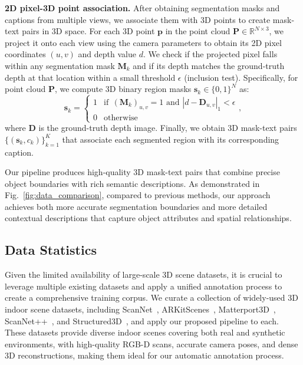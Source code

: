 \noindent\textbf{2D pixel-3D point association.}
After obtaining segmentation masks and captions from multiple views, we associate them with 3D points to create mask-text pairs in 3D space.
For each 3D point $\mathbf{p}$ in the point cloud $\mathbf{P} \in \mathbb{R}^{N\times3}$, we project it onto each view using the camera parameters to obtain its 2D pixel coordinates $(u,v)$ and depth value $d$.
We check if the projected pixel falls within any segmentation mask $\mathbf{M}_k$ and if its depth matches the ground-truth depth at that location within a small threshold $\epsilon$ (inclusion test).
Specifically, for point cloud $\mathbf{P}$, 
we compute 3D binary region masks $\mathbf{s}_k \in \{0,1\}^N$ as:
\begin{equation}\label{eq:associate}
    \!\! \mathbf{s}_k = \left\{ 
    \begin{array}{cl}
        \! 1 & \!\!\! \textrm{if}~~(\mathbf{M}_{k})_{u,v} = 1 \textrm{ and } |d - \mathbf{D}_{u,v}|_1 < \epsilon \\
        \! 0 & \!\!\! \textrm{otherwise}
    \end{array}
    \right. \!\!\!\! ,
\end{equation}
where $\mathbf{D}$ is the ground-truth depth image. Finally, we obtain 3D mask-text pairs $\{(\mathbf{s}_k, c_k)\}_{k=1}^K$ that associate each segmented region with its corresponding caption.

Our pipeline produces high-quality 3D mask-text pairs that combine precise object boundaries with rich semantic descriptions. As demonstrated in Fig.~\ref{fig:data_comparison}, compared to previous methods, our approach achieves both more accurate segmentation boundaries and more detailed contextual descriptions that capture object attributes and spatial relationships.

\subsection{Data Statistics}
Given the limited availability of large-scale 3D scene datasets, it is crucial to leverage multiple existing datasets and apply a unified annotation process to create a comprehensive training corpus.
We curate a collection of widely-used 3D indoor scene datasets, including ScanNet~\cite{dai2017scannet}, ARKitScenes~\cite{baruch2021arkitscenes}, Matterport3D~\cite{chang2017matterport3d}, ScanNet++~\cite{yeshwanth2023scannet++}, and Structured3D~\cite{zheng2020structured3d}, and apply our proposed pipeline to each.
These datasets provide diverse indoor scenes covering both real and synthetic environments, with high-quality RGB-D scans, accurate camera poses, and dense 3D reconstructions, making them ideal for our automatic annotation process.


